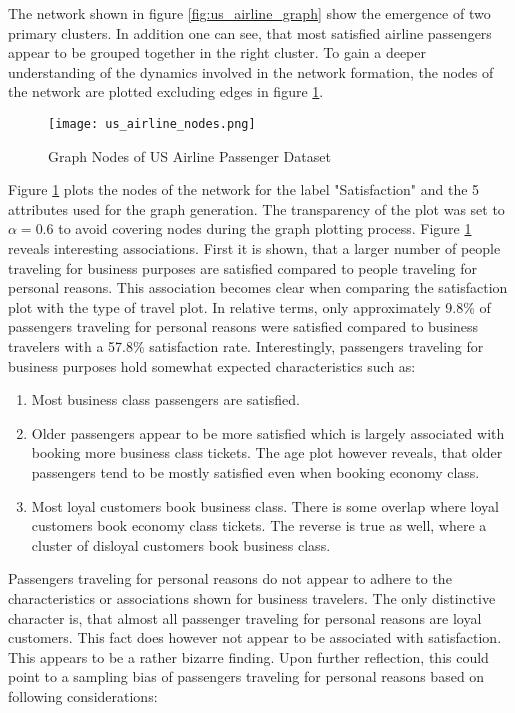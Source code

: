   \noindent The network shown in figure \ref{fig:us_airline_graph} show the
  emergence of two primary clusters. In addition one can see, that most satisfied 
  airline passengers appear to be grouped together in the right cluster. To 
  gain a deeper understanding of the dynamics involved in the network formation, 
  the nodes of the network are plotted excluding edges in figure
  \ref{fig:us_airline_nodes}.

  \begin{figure}[h]
	  \centering
	  \texttt{[image: us\_airline\_nodes.png]}
	  \caption{Graph Nodes of US Airline Passenger Dataset}
      \label{fig:us_airline_nodes}
  \end{figure}

  \noindent Figure \ref{fig:us_airline_nodes} plots the nodes of the network
  for the label "Satisfaction" and the 5 attributes used for the graph
  generation. The transparency of the plot was set to $\alpha = 0.6$ to avoid 
  covering nodes during the graph plotting process. Figure
  \ref{fig:us_airline_nodes} reveals interesting associations. First it is
  shown, that a larger number of people traveling for business purposes are 
  satisfied compared to people traveling for personal reasons. This association
  becomes clear when comparing the satisfaction plot with the type of travel
  plot. In relative terms, only approximately 9.8\% of passengers traveling for 
  personal reasons were satisfied compared to business travelers with a 57.8\% 
  satisfaction rate. Interestingly, passengers traveling for business purposes
  hold somewhat expected characteristics such as:

  \begin{enumerate}
    \item Most business class passengers are satisfied. 
    \item Older passengers appear to be more satisfied which is largely
      associated with booking more business class tickets. The age plot however 
      reveals, that older passengers tend to be mostly satisfied even when 
      booking economy class.
    \item Most loyal customers book business class. There is some overlap where 
      loyal customers book economy class tickets. The reverse is true as well, 
      where a cluster of disloyal customers book business class. 
  \end{enumerate}
  
  \noindent Passengers traveling for personal reasons do not appear to adhere
  to the characteristics or associations shown for business travelers. The only
  distinctive character is, that almost all passenger traveling for personal
  reasons are loyal customers. This fact does however not appear to be
  associated with satisfaction. This appears to be a rather bizarre finding.
  Upon further reflection, this could point to a sampling bias of passengers
  traveling for personal reasons based on following considerations:

